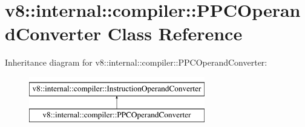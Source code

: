 \hypertarget{classv8_1_1internal_1_1compiler_1_1PPCOperandConverter}{}\section{v8\+:\+:internal\+:\+:compiler\+:\+:P\+P\+C\+Operand\+Converter Class Reference}
\label{classv8_1_1internal_1_1compiler_1_1PPCOperandConverter}
Inheritance diagram for v8\+:\+:internal\+:\+:compiler\+:\+:P\+P\+C\+Operand\+Converter\+:\begin{figure}[H]
\begin{center}
\leavevmode
\includegraphics[height=2.000000cm]{classv8_1_1internal_1_1compiler_1_1PPCOperandConverter}
\end{center}
\end{figure}
